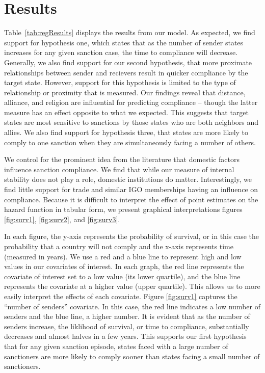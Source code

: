 \section*{Results}
\label{Results} 

Table~\ref{tab:regResults} displays the results from our model. As expected, we find support for hypothesis one, which states that as the number of sender states increases for any given sanction case, the time to compliance will decrease. Generally, we also find support for our second hypothesis, that more proximate relationships between sender and recievers result in quicker compliance by the target state. However, support for this hypothesis is limited to the type of relationship or proximity that is measured. Our findings reveal that distance, alliance, and religion are influential for predicting compliance -- though the latter measure has an effect opposite to what we expected. This suggests that target states are most sensitive to sanctions by those states who are both neighbors and allies. We also find support for hypothesis three, that states are more likely to comply to one sanction when they are simultaneously facing a number of others. 


\FloatBarrier

We control for the prominent idea from the literature that domestic factors influence sanction compliance. We find that while our measure of internal stability does not play a role, domestic institutions do matter. Interestingly, we find little support for trade and similar IGO memberships having an influence on compliance. Because it is difficult to interpret the effect of point estimates on the hazard function in tabular form, we present graphical interpretations figures \ref{fig:surv1}, \ref{fig:surv2}, and \ref{fig:surv3}. 

In each figure, the y-axis represents the probability of survival, or in this case the probability that a country will not comply and the x-axis represents time (measured in years). We use a red and a blue line to represent high and low values in our covariates of interest. In each graph, the red line represents the covariate of interest set to a low value (its lower quartile), and the blue line represents the covariate at a higher value (upper quartile). This allows us to more easily interpret the effects of each covariate. Figure \ref{fig:surv1} captures the ``number of senders'' covariate. In this case, the red line indicates a low number of senders and the blue line, a higher number. It is evident that as the number of senders increase, the liklihood of survival, or time to compliance, substantially decreases and almost halves in a few years. This supports our first hypothesis that for any given sanction episode, states faced with a large number of sanctioners are more likely to comply sooner than states facing a small number of sanctioners.

